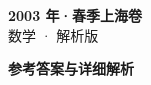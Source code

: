 \documentclass[zihao=-4, a4paper]{ctexart}
\begin{document}
\begin{center}
  {\Large\bfseries 2003 年·春季上海卷}\\[4pt]
  {\large 数学 · 解析版}
\end{center}
\medskip
{}

\clearpage
{}
\begin{center}{\Large\bfseries 参考答案与详细解析}\end{center}
\medskip

\end{document}
